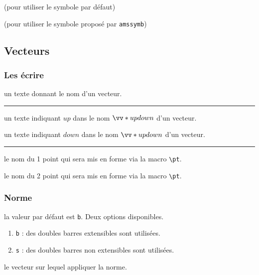 \documentclass[12pt,a4paper]{article}
\theoremstyle{definition}
\newcommand\env[1]{\texttt{#1}}
\newcommand\macro[1]{\env{\textbackslash{}#1}}
\newcommand\separation{
    \medskip
    \hfill\rule{0.5\textwidth}{0.75pt}\hfill
    \medskip
}
\newcommand\extraspace{
    \vspace{0.25em}
}
\begin{document}


\extraspace

 (pour utiliser le symbole par défaut)

 (pour utiliser le symbole proposé par \verb+amssymb+)


\subsection{Vecteurs}

\subsubsection{Les écrire}




\IDarg{} un texte donnant le nom d'un vecteur.


\separation



 un texte indiquant $up$ dans le nom $\vect*{up}{down}$ d'un vecteur.

 un texte indiquant $down$ dans le nom $\vect*{up}{down}$ d'un vecteur.


\separation



 le nom du 1\ier{} point qui sera mis en forme via la macro \macro{pt}.

 le nom du 2\ieme{} point qui sera mis en forme via la macro \macro{pt}.


\subsubsection{Norme}




\IDoption{} la valeur par défaut est \verb+b+. Deux options disponibles.
\begin{enumerate}
	\item \verb+b+ : des doubles barres extensibles sont utilisées.

	\item \verb+s+ : des doubles barres non extensibles sont utilisées.
\end{enumerate}


\IDarg{} le vecteur sur lequel appliquer la norme.
\end{document}
